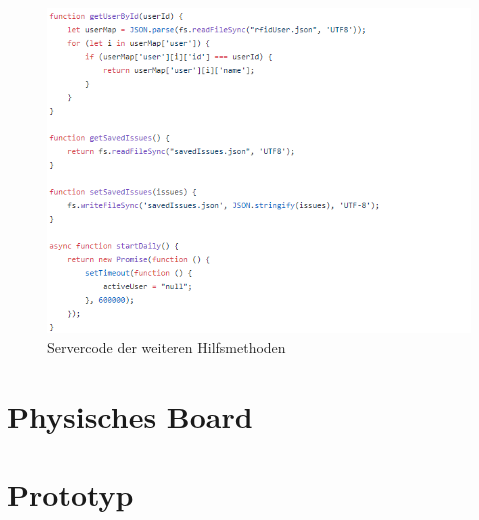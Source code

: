 \documentclass[12pt,titlepage]{scrartcl}
\begin{document}
\begin{appendix}
\begin{figure}[H]
    			\includegraphics[height=0.65\textheight]{serverHelper}
  				\caption{Servercode der weiteren Hilfsmethoden}
  				\label{fig:ANHServerHelper}
			\end{figure}
		\newpage 	  	
 	  	\section{Physisches Board} \label{ANHPhysischesBoard}
		\newpage 	  	
 	  	\section{Prototyp}
 	\end{appendix}
 	
 	\newpage

 	
 	
\end{document}
